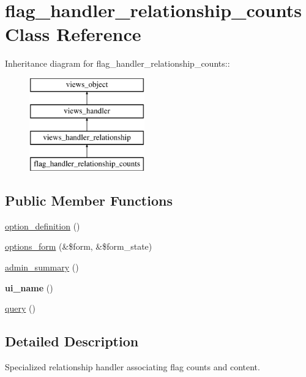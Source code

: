 \hypertarget{classflag__handler__relationship__counts}{
\section{flag\_\-handler\_\-relationship\_\-counts Class Reference}
\label{classflag__handler__relationship__counts}
}
Inheritance diagram for flag\_\-handler\_\-relationship\_\-counts::\begin{figure}[H]
\begin{center}
\leavevmode
\includegraphics[height=4cm]{classflag__handler__relationship__counts}
\end{center}
\end{figure}
\subsection*{Public Member Functions}
\begin{CompactItemize}
\item 
\hyperlink{classflag__handler__relationship__counts_d72acb678e22ecdaeb867b89f051863e}{option\_\-definition} ()
\item 
\hyperlink{classflag__handler__relationship__counts_a99b83dd638a7e41aeaff5ae9c013efe}{options\_\-form} (\&\$form, \&\$form\_\-state)
\item 
\hyperlink{classflag__handler__relationship__counts_69a8b8c5c2a4ffa37f3cded6990716b2}{admin\_\-summary} ()
\item 
\hypertarget{classflag__handler__relationship__counts_923837c0c1b3e960edf5be511b9459b1}{
\textbf{ui\_\-name} ()}
\label{classflag__handler__relationship__counts_923837c0c1b3e960edf5be511b9459b1}

\item 
\hyperlink{classflag__handler__relationship__counts_18060bfeb86c50ff51325f4dbeb93663}{query} ()
\end{CompactItemize}


\subsection{Detailed Description}
Specialized relationship handler associating flag counts and content. 

